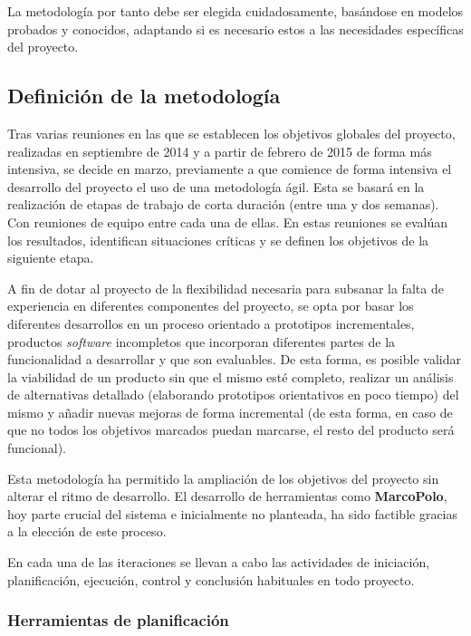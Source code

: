 La metodología por tanto debe ser elegida cuidadosamente, basándose en modelos probados y conocidos, adaptando si es necesario estos a las necesidades específicas del proyecto.

\subsection{Definición de la metodología}

Tras varias reuniones en las que se establecen los objetivos globales del proyecto, realizadas en septiembre de 2014 y a partir de febrero de 2015 de forma más intensiva, se decide en marzo, previamente a que comience de forma intensiva el desarrollo del proyecto el uso de una metodología ágil. Esta se basará en la realización de etapas de trabajo de corta duración (entre una y dos semanas). Con reuniones de equipo entre cada una de ellas. En estas reuniones se evalúan los resultados, identifican situaciones críticas y se definen los objetivos de la siguiente etapa.

A fin de dotar al proyecto de la flexibilidad necesaria para subsanar la falta de experiencia en diferentes componentes del proyecto, se opta por basar los diferentes desarrollos en un proceso orientado a prototipos incrementales, productos \textit{software} incompletos que incorporan diferentes partes de la funcionalidad a desarrollar y que son evaluables. De esta forma, es posible validar la viabilidad de un producto sin que el mismo esté completo, realizar un análisis de alternativas detallado (elaborando prototipos orientativos en poco tiempo) del mismo y añadir nuevas mejoras de forma incremental (de esta forma, en caso de que no todos los objetivos marcados puedan marcarse, el resto del producto será funcional).

Esta metodología ha permitido la ampliación de los objetivos del proyecto sin alterar el ritmo de desarrollo. El desarrollo de herramientas como \textbf{MarcoPolo}, hoy parte crucial del sistema e inicialmente no planteada, ha sido factible gracias a la elección de este proceso.

En cada una de las iteraciones se llevan a cabo las actividades de iniciación, planificación, ejecución, control y conclusión habituales en todo proyecto.

\subsubsection{Herramientas de planificación}

